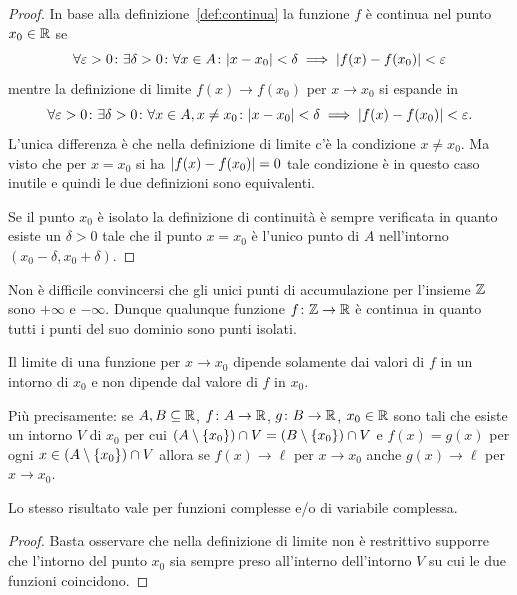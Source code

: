   \begin{proof}
  In base alla definizione~\ref{def:continua} la funzione $f$ è continua nel
  punto $x_0\in {\mathbb R}$ se
  \[
   \forall \varepsilon>0 \colon \exists \delta >0 \colon
   \forall x \in A\colon
   {\left|x-x_0\right|}<\delta \implies {\left|f(x)-f(x_0)\right|} < \varepsilon
  \]
  mentre la definizione di limite $f(x)\to f(x_0)$ per $x\to x_0$
  si espande in
  \[
  \forall \varepsilon>0 \colon \exists \delta>0\colon
  \forall x \in A, x\neq x_0\colon
  {\left|x-x_0\right|}<\delta \implies {\left|f(x)-f(x_0)\right|} < \varepsilon.
  \]
  L'unica differenza è che nella definizione di limite
  c'è la condizione $x\neq x_0$. Ma visto che per $x=x_0$
  si ha ${\left|f(x)-f(x_0)\right|}=0$ tale condizione è in questo caso 
  inutile e quindi le due definizioni sono equivalenti.

  Se il punto $x_0$ è isolato la definizione di continuità
  è sempre verificata in quanto esiste un $\delta>0$ 
  tale che il punto $x=x_0$ è l'unico punto di $A$ 
  nell'intorno $(x_0-\delta,x_0+\delta)$.
  \end{proof}

\begin{example}
  Non è difficile convincersi che gli unici punti di accumulazione 
  per l'insieme ${\mathbb Z}$ sono $+\infty$ e $-\infty$.
  Dunque qualunque funzione $f\colon {\mathbb Z} \to {\mathbb R}$ è continua in quanto 
  tutti i punti del suo dominio sono punti isolati.
\end{example}
  
\begin{theorem}%
\label{th:localita_limite}%
Il limite di una funzione per $x\to x_0$ dipende solamente dai valori di $f$
in un intorno di $x_0$ e non dipende dal valore di $f$ in $x_0$.

Più precisamente: se $A,B\subseteq {\mathbb R}$, $f\colon A\to {\mathbb R}$, $g\colon B\to {\mathbb R}$, 
$x_0\in {\mathbb R}$ sono tali che 
esiste un intorno $V$ di $x_0$ per cui 
$(A\setminus{\left\{ x_0 \right\}}) \cap  V = (B\setminus {\left\{ x_0 \right\}}) \cap V$ 
e $f(x)=g(x)$ per ogni $x\in(A\setminus{\left\{ x_0 \right\}}) \cap  V$ 
allora se $f(x)\to \ell$ per $x\to x_0$ anche $g(x)\to \ell$ 
per $x\to x_0$.

Lo stesso risultato vale per funzioni complesse e/o di variabile complessa.
\end{theorem}
%
\begin{proof}
  Basta osservare che nella definizione di limite 
  non è restrittivo supporre che l'intorno del punto $x_0$ 
  sia sempre preso all'interno dell'intorno $V$ su cui 
  le due funzioni coincidono.
\end{proof}

